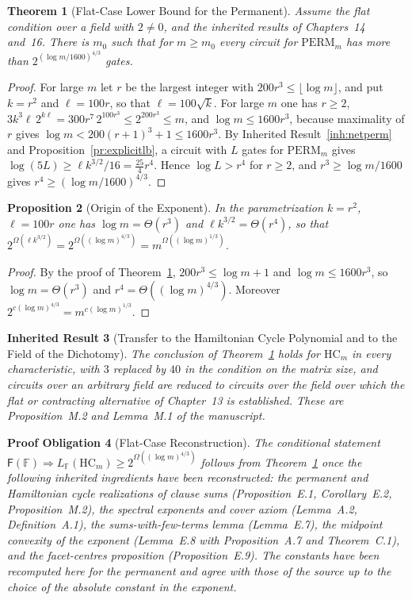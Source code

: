 \documentclass[11pt,letterpaper]{report}
\theoremstyle{plain}
\newtheorem{theorem}{Theorem}[chapter]
\newtheorem{proposition}[theorem]{Proposition}
\newtheorem{inherited}[theorem]{Inherited Result}
\newtheorem{obligation}[theorem]{Proof Obligation}
\theoremstyle{definition}
\theoremstyle{remark}
\begin{document}
\begin{theorem}[Flat-Case Lower Bound for the Permanent]\label{th:flatrate}
Assume the flat condition over a field with $2\ne0$, and the inherited results of Chapters~14 and~16. There is $m_0$ such that for $m\ge m_0$ every circuit for $\mathrm{PERM}_m$ has more than $2^{(\log m/1600)^{4/3}}$ gates.
\end{theorem}
\begin{proof}
For large $m$ let $r$ be the largest integer with $200r^3\le\lfloor\log m\rfloor$, and put $k=r^2$ and $\ell=100r$, so that $\ell=100\sqrt k$. For large $m$ one has $r\ge2$, $3k^3\ell\,2^{k\ell}=300r^7\,2^{100r^3}\le2^{200r^3}\le m$, and $\log m\le1600r^3$, because maximality of $r$ gives $\log m<200(r+1)^3+1\le1600r^3$. By Inherited Result~\ref{inh:netperm} and Proposition~\ref{pr:explicitlb}, a circuit with $L$ gates for $\mathrm{PERM}_m$ gives $\log(5L)\ge\ell k^{3/2}/16=\tfrac{25}4r^4$. Hence $\log L>r^4$ for $r\ge2$, and $r^3\ge\log m/1600$ gives $r^4\ge(\log m/1600)^{4/3}$.
\end{proof}

\begin{proposition}[Origin of the Exponent]
In the parametrization $k=r^2$, $\ell=100r$ one has $\log m=\Theta(r^3)$ and $\ell k^{3/2}=\Theta(r^4)$, so that $2^{\Omega(\ell k^{3/2})}=2^{\Omega((\log m)^{4/3})}=m^{\Omega((\log m)^{1/3})}$.
\end{proposition}
\begin{proof}
By the proof of Theorem~\ref{th:flatrate}, $200r^3\le\log m+1$ and $\log m\le1600r^3$, so $\log m=\Theta(r^3)$ and $r^4=\Theta((\log m)^{4/3})$. Moreover $2^{c(\log m)^{4/3}}=m^{c(\log m)^{1/3}}$.
\end{proof}

\begin{inherited}[Transfer to the Hamiltonian Cycle Polynomial and to the Field of the Dichotomy]
The conclusion of Theorem~\ref{th:flatrate} holds for $\mathrm{HC}_m$ in every characteristic, with $3$ replaced by $40$ in the condition on the matrix size, and circuits over an arbitrary field are reduced to circuits over the field over which the flat or contracting alternative of Chapter~13 is established. These are Proposition~M.2 and Lemma~M.1 of the manuscript.
\end{inherited}

\begin{obligation}[Flat-Case Reconstruction]
The conditional statement $\mathsf F(\mathbb F)\Rightarrow L_{\mathbb F}(\mathrm{HC}_m)\ge2^{\Omega((\log m)^{4/3})}$ follows from Theorem~\ref{th:flatrate} once the following inherited ingredients have been reconstructed: the permanent and Hamiltonian cycle realizations of clause sums (Proposition~E.1, Corollary~E.2, Proposition~M.2), the spectral exponents and cover axiom (Lemma~A.2, Definition~A.1), the sums-with-few-terms lemma (Lemma~E.7), the midpoint convexity of the exponent (Lemma~E.8 with Proposition~A.7 and Theorem~C.1), and the facet-centres proposition (Proposition~E.9). The constants have been recomputed here for the permanent and agree with those of the source up to the choice of the absolute constant in the exponent.
\end{obligation}
\end{document}
